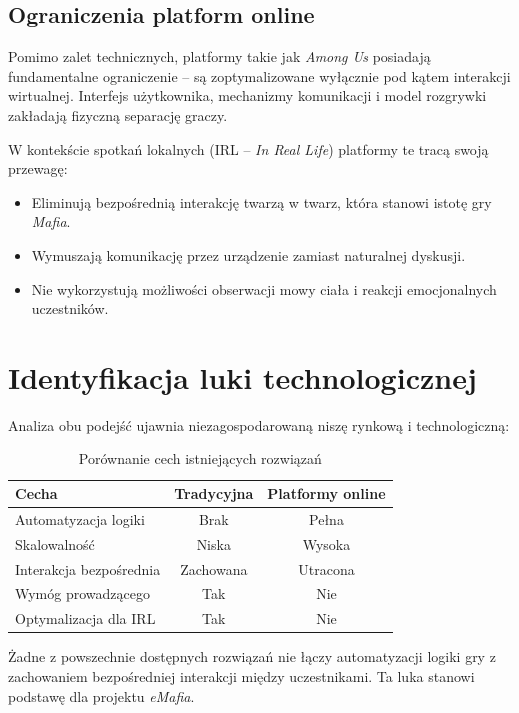 ﻿\documentclass[a4paper,twoside,11pt]{mwrep}
\theoremstyle{plain} \newtheorem{thm}{Twierdzenie}
\theoremstyle{plain} \newtheorem{lem}{Lemat}
\theoremstyle{definition} \newtheorem{defn}{Definicja}
\theoremstyle{remark} \newtheorem*{rem}{Wniosek}
\begin{document}
\subsection{Ograniczenia platform online}

Pomimo zalet technicznych, platformy takie jak \textit{Among Us} posiadają fundamentalne ograniczenie -- są zoptymalizowane wyłącznie pod kątem interakcji wirtualnej. Interfejs użytkownika, mechanizmy komunikacji i model rozgrywki zakładają fizyczną separację graczy.

W kontekście spotkań lokalnych (IRL -- \textit{In Real Life}) platformy te tracą swoją przewagę:
\begin{itemize}
    \item Eliminują bezpośrednią interakcję twarzą w twarz, która stanowi istotę gry \textit{Mafia}.
    \item Wymuszają komunikację przez urządzenie zamiast naturalnej dyskusji.
    \item Nie wykorzystują możliwości obserwacji mowy ciała i reakcji emocjonalnych uczestników.
\end{itemize}

\section{Identyfikacja luki technologicznej}

Analiza obu podejść ujawnia niezagospodarowaną niszę rynkową i technologiczną:

\begin{table}[h]
\centering
\begin{tabular}{|l|c|c|}
\hline
\textbf{Cecha} & \textbf{Tradycyjna} & \textbf{Platformy online} \\
\hline
Automatyzacja logiki & Brak & Pełna \\
Skalowalność & Niska & Wysoka \\
Interakcja bezpośrednia & Zachowana & Utracona \\
Wymóg prowadzącego & Tak & Nie \\
Optymalizacja dla IRL & Tak & Nie \\
\hline
\end{tabular}
\caption{Porównanie cech istniejących rozwiązań}
\label{tab:porownanie_rozwiazan}
\end{table}

Żadne z powszechnie dostępnych rozwiązań nie łączy automatyzacji logiki gry z zachowaniem bezpośredniej interakcji między uczestnikami. Ta luka stanowi podstawę dla projektu \textit{eMafia}.
\end{document}
